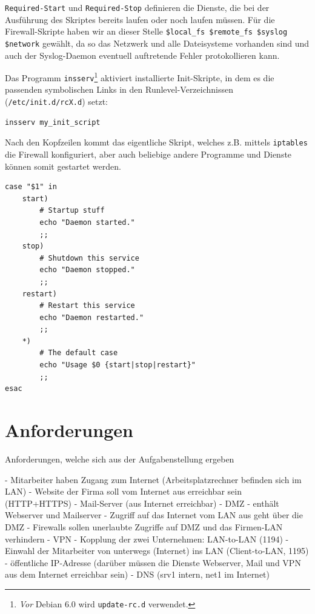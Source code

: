 {\tt Required-Start} und {\tt Required-Stop} definieren die Dienste, die bei
der Aus\-füh\-rung des Skriptes bereits laufen oder noch laufen müssen.
Für die Firewall-Skripte haben wir an dieser Stelle
\verb!$local_fs $remote_fs $syslog $network! gewählt, da so das Netzwerk und
alle Dateisysteme vorhanden sind und auch der Syslog-Daemon eventuell
auftretende Fehler protokollieren kann.

Das Programm {\tt insserv}\footnote{
\emph{Vor} Debian 6.0 wird {\tt update-rc.d} verwendet.
} aktiviert installierte Init-Skripte, in dem es die passenden symbolischen
Links in den Runlevel-Verzeichnissen ({\tt /etc/init.d/rcX.d}) setzt:

\begin{verbatim}
insserv my_init_script
\end{verbatim}

Nach den Kopfzeilen kommt das eigentliche Skript, welches z.B. mittels
{\tt iptables} die Firewall konfiguriert, aber auch beliebige andere Programme
und Dienste können somit gestartet werden.

\begin{lstlisting}[label=lst:lsb-script,caption={Init Script LSB: Eigentliches Skript.}]
case "$1" in
    start)
        # Startup stuff
        echo "Daemon started."
        ;;
    stop)
        # Shutdown this service
        echo "Daemon stopped."
        ;;
    restart)
        # Restart this service
        echo "Daemon restarted."
        ;;
    *)
        # The default case
        echo "Usage $0 {start|stop|restart}"
        ;;
esac
\end{lstlisting}


\section{Anforderungen}

Anforderungen, welche sich aus der Aufgabenstellung ergeben

- Mitarbeiter haben Zugang zum Internet (Arbeitsplatzrechner befinden sich im LAN)
- Website der Firma soll vom Internet aus erreichbar sein (HTTP+HTTPS)
- Mail-Server (aus Internet erreichbar)
- DMZ
  - enthält Webserver und Mailserver
  - Zugriff auf das Internet vom LAN aus geht über die DMZ
- Firewalls sollen unerlaubte Zugriffe auf DMZ und das Firmen-LAN verhindern
- VPN
  - Kopplung der zwei Unternehmen: LAN-to-LAN (1194)
  - Einwahl der Mitarbeiter von unterwegs (Internet) ins LAN (Client-to-LAN, 1195)
- öffentliche IP-Adresse (darüber müssen die Dienste Webserver, Mail und VPN aus dem Internet erreichbar sein)
- DNS (srv1 intern, net1 im Internet)


